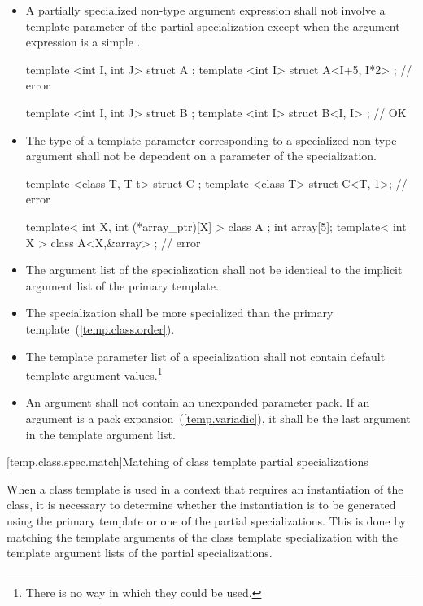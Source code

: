 \begin{itemize}
\item
A partially specialized non-type argument expression shall not involve
a template parameter of the partial specialization except when the argument
expression is a simple
.
\enterexample
\begin{codeblock}
template <int I, int J> struct A {};
template <int I> struct A<I+5, I*2> {}; // error

template <int I, int J> struct B {};
template <int I> struct B<I, I> {};     // OK
\end{codeblock}
\exitexample
\item
The type of a template parameter corresponding to a specialized non-type argument
shall not be dependent on a parameter of the specialization.
\enterexample

\begin{codeblock}
template <class T, T t> struct C {};
template <class T> struct C<T, 1>;                  // error

template< int X, int (*array_ptr)[X] > class A {};
int array[5];
template< int X > class A<X,&array> { };            // error
\end{codeblock}

\exitexample
\item
The argument list of the specialization shall not be identical to the
implicit argument list of the primary template.

\item
The specialization shall be more specialized than the primary
template~(\ref{temp.class.order}).

\item
The template parameter list of a specialization shall not contain default
template argument values.\footnote{There is no way in which they could be used.}
\item
An argument shall not contain an unexpanded parameter pack. If
an argument is a pack expansion~(\ref{temp.variadic}), it shall be
the last argument in the template argument list.
\end{itemize}

[temp.class.spec.match]{Matching of class template partial specializations}

\pnum
When a class template is used in a context that requires an instantiation of
the class,
it is necessary to determine whether the instantiation is to be generated
using the primary template or one of the partial specializations.
This is done by matching the template arguments of the class template
specialization with the template argument lists of the partial
specializations.

